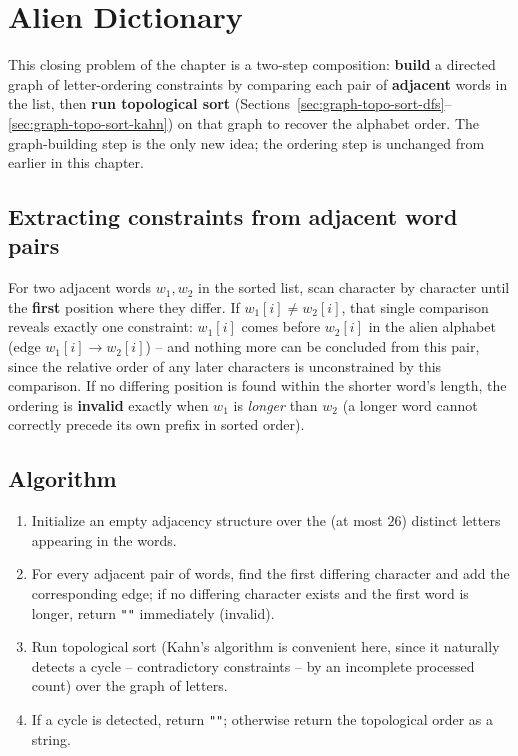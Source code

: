 \section{Alien Dictionary}
\label{sec:graph-alien-dictionary}


\begin{patternbox}
This closing problem of the chapter is a two-step composition:
\textbf{build} a directed graph of letter-ordering constraints by
comparing each pair of \textbf{adjacent} words in the list, then
\textbf{run topological sort} (Sections~\ref{sec:graph-topo-sort-dfs}--\ref{sec:graph-topo-sort-kahn})
on that graph to recover the alphabet order. The graph-building step is
the only new idea; the ordering step is unchanged from earlier in this
chapter.
\end{patternbox}

\subsection*{Extracting constraints from adjacent word pairs}

For two adjacent words $w_1, w_2$ in the sorted list, scan character by
character until the \textbf{first} position where they differ. If
$w_1[i] \neq w_2[i]$, that single comparison reveals exactly one
constraint: $w_1[i]$ comes before $w_2[i]$ in the alien alphabet
(edge $w_1[i] \to w_2[i]$) -- and nothing more can be concluded from
this pair, since the relative order of any later characters is
unconstrained by this comparison. If no differing position is found
within the shorter word's length, the ordering is \textbf{invalid}
exactly when $w_1$ is \emph{longer} than $w_2$ (a longer word cannot
correctly precede its own prefix in sorted order).

\subsection*{Algorithm}

\begin{enumerate}
  \item Initialize an empty adjacency structure over the (at most
        $26$) distinct letters appearing in the words.
  \item For every adjacent pair of words, find the first differing
        character and add the corresponding edge; if no differing
        character exists and the first word is longer, return
        \texttt{""} immediately (invalid).
  \item Run topological sort (Kahn's algorithm is convenient here,
        since it naturally detects a cycle -- contradictory
        constraints -- by an incomplete processed count) over the
        graph of letters.
  \item If a cycle is detected, return \texttt{""}; otherwise return
        the topological order as a string.
\end{enumerate}

